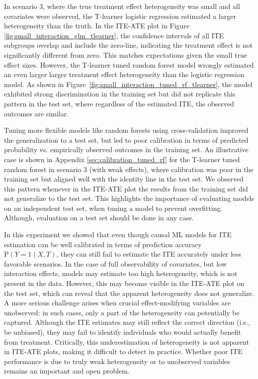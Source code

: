 

In scenario 3, where the true treatment effect heterogeneity was small and all covariates were observed, the T-learner logistic regression estimated a larger heterogeneity than the truth. In the ITE-ATE plot in Figure \ref{fig:small_interaction_glm_tlearner}, the confidence intervals of all ITE subgroups overlap and include the zero-line, indicating the treatment effect is not significantly different from zero. This matches expectations given the small true effect sizes. However, the T-learner tuned random forest model wrongly estimated an even larger larger treatment effect heterogeneity than the logistic regression model. As shown in Figure~\ref{fig:small_interaction_tuned_rf_tlearner}, the model exhibited strong discrimination in the training set but did not replicate this pattern in the test set, where regardless of the estimated ITE, the observed outcomes are similar.



Tuning more flexible models like random forests using cross-validation improved the generalization to a test set, but led to poor calibration in terms of predicted probability vs. empirically observed outcomes in the training set. An illustrative case is shown in Appendix \ref{sec:calibration_tuned_rf} for the T-learner tuned random forest in scenario 3 (with weak effects), where calibration was poor in the training set but aligned well with the identity line in the test set. We observed this pattern whenever in the ITE-ATE plot the results from the training set did not generalize to the test set. This highlights the importance of evaluating models on an independent test set, when tuning a model to prevent overfitting. Although, evaluation on a test set should be done in any case.

In this experiment we showed that even though causal ML models for ITE estimation can be well calibrated in terms of prediction accuracy $\text{P}(Y=1 \mid X, T)$, they can still fail to estimate the ITE accurately under less favorable scenarios. In the case of full observability of covariates, but low interaction effects, models may estimate too high heterogeneity, which is not present in the data. However, this may become visible in the ITE-ATE plot on the test set, which can reveal that the apparent heterogeneity does not generalize. A more serious challenge arises when crucial effect-modifying variables are unobserved: in such cases, only a part of the heterogeneity can potentially be captured. Although the ITE estimates may still reflect the correct direction (i.e., be unbiased), they may fail to identify individuals who would actually benefit from treatment. Critically, this underestimation of heterogeneity is not apparent in ITE-ATE plots, making it difficult to detect in practice. Whether poor ITE performance is due to truly weak heterogeneity or to unobserved variables remains an important and open problem. 



